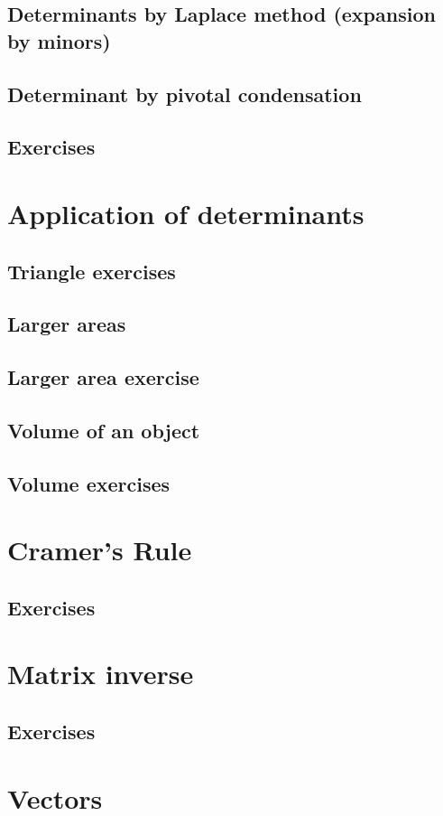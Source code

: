 \subsection{Determinants by Laplace method (expansion by minors)}{
\subsection{Determinant by pivotal condensation}
\subsection{Exercises}
\section{Application of determinants}
\subsection{Triangle exercises}
\subsection{Larger areas}
\subsection{Larger area exercise}
\subsection{Volume of an object}
\subsection{Volume exercises}
\section{Cramer's Rule}
\subsection{Exercises}
\section{Matrix inverse}
\subsection{Exercises}
\section{Vectors}
}
